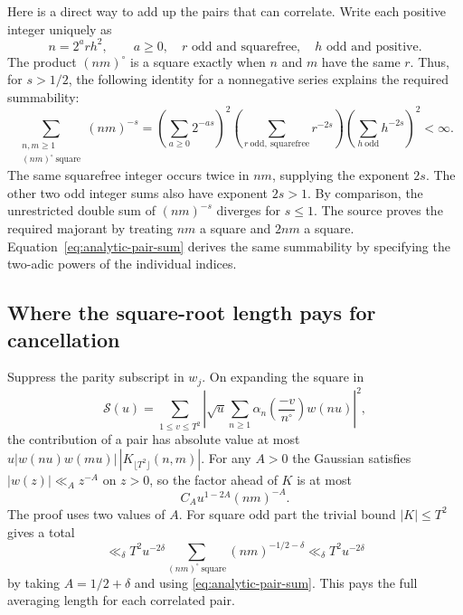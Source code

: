\documentclass[11pt,letterpaper]{article}
\begin{document}
Here is a direct way to add up the pairs that can correlate. Write each positive integer uniquely as
\[
       n=2^a r h^2,\qquad a\ge0,\quad
       r\text{ odd and squarefree},\quad h\text{ odd and positive}.
\]
The product \((nm)^\circ\) is a square exactly when \(n\) and \(m\) have the same \(r\). Thus, for \(s>1/2\), the following identity for a nonnegative series explains the required summability:
\begin{equation}
 \sum_{\substack{n,m\ge1\\(nm)^\circ\ \mathrm{square}}}
          (nm)^{-s}
 =\left(\sum_{a\ge0}2^{-as}\right)^2
     \left(\sum_{r\ \mathrm{odd,\ squarefree}}r^{-2s}\right)
     \left(\sum_{h\ \mathrm{odd}}h^{-2s}\right)^2
 <\infty .
 \label{eq:analytic-pair-sum}
\end{equation}
The same squarefree integer occurs twice in \(nm\), supplying the exponent \(2s\). The other two odd integer sums also have exponent \(2s>1\). By comparison, the unrestricted double sum of \((nm)^{-s}\) diverges for \(s\le1\). The source proves the required majorant by treating \(nm\) a square and \(2nm\) a square. Equation~\eqref{eq:analytic-pair-sum} derives the same summability by specifying the two-adic powers of the individual indices.

\subsection{Where the square-root length pays for cancellation}

Suppress the parity subscript in \(w_j\). On expanding the square in
\[
  \mathcal S(u)=\sum_{1\le v\le T^2}
      \left|\sqrt u\sum_{n\ge1}\alpha_n
           \left(\frac{-v}{n^\circ}\right)w(nu)\right|^2,
\]
the contribution of a pair has absolute value at most
\(
      u|w(nu)w(mu)|\,|K_{\lfloor T^2\rfloor}(n,m)|.
\)
For any \(A>0\) the Gaussian satisfies \(|w(z)|\ll_A z^{-A}\) on \(z>0\), so the factor ahead of \(K\) is at most
\[
        C_A u^{1-2A}(nm)^{-A}.
\]
The proof uses two values of \(A\). For square odd part the trivial bound \(|K|\le T^2\) gives a total
\[
      \ll_\delta T^2 u^{-2\delta}
                \sum_{(nm)^\circ\ \mathrm{square}}(nm)^{-1/2-\delta}
      \ll_\delta T^2 u^{-2\delta}
\]
by taking \(A=1/2+\delta\) and using \eqref{eq:analytic-pair-sum}. This pays the full averaging length for each correlated pair.
\end{document}
